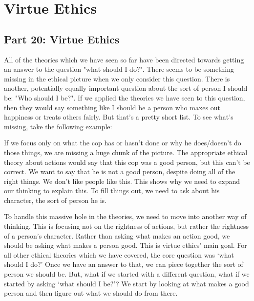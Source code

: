 \part{Virtue Ethics}
\label{ch.mod7}
\chapter{Part 20: Virtue Ethics}

All of the theories which we have seen so far have been directed towards getting an answer to the question "what should I do?". There seems to be something missing in the ethical picture when we only consider this question. There is another, potentially equally important question about the sort of person I should be: "Who should I be?". If we applied the theories we have seen to this question, then they would say something like I should be a person who maxes out happiness or treats others fairly. But that’s a pretty short list. To see what’s missing, take the following example:


If we focus only on what the cop has or hasn’t done or why he does/doesn’t do those things, we are missing a huge chunk of the picture. The appropriate ethical theory about actions would say that this cop was a good person, but this can't be correct.  We want to say that he is not a good person, despite doing all of the right things. We don’t like people like this. This shows why we need to expand our thinking to explain this. To fill things out, we need to ask about his character, the sort of person he is.

To handle this massive hole in the theories, we need to move into another way of thinking. This is focusing not on the rightness of actions, but rather the rightness of a person’s character. Rather than asking what makes an action good, we should be asking what makes a person good. This is virtue ethics’ main goal. For all other ethical theories which we have covered, the core question was ‘what should I do?’ Once we have an answer to that, we can piece together the sort of person we should be. But, what if we started with a different question, what if we started by asking ‘what should I be?’? We start by looking at what makes a good person and then figure out what we should do from there.

